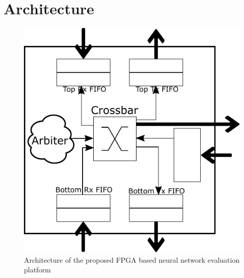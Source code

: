 \section{Architecture}
\label{sec:arch}

\begin{figure}[t]
\centering
   \includegraphics[height=0.7\columnwidth]{Figures/switch.pdf}
   \caption{Architecture of the proposed FPGA based neural network evaluation platform}
   \label{fig:sysArch}
\end{figure}